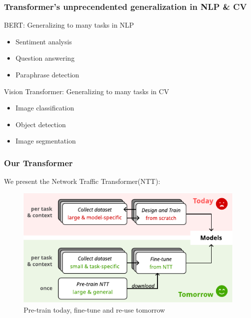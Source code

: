 \documentclass{beamer}
\begin{document}
\begin{frame}
\frametitle{Transformer's unprecendented generalization in NLP \& CV}
\pause

BERT: Generalizing to many tasks in NLP

\begin{itemize}  
    \item<1-> Sentiment analysis
    \item<1-> Question answering
    \item<1-> Paraphrase detection
\end{itemize}
\pause

Vision Transformer: Generalizing to many tasks in CV

\begin{itemize}  
    \item<1-> Image classification
    \item<1-> Object detection
    \item<1-> Image segmentation
\end{itemize}



\end{frame}


\begin{frame}
\frametitle{Our Transformer}

We present the Network Traffic Transformer(NTT):
\pause

\begin{figure}[!hbt]
  \begin{center}
    \includegraphics[scale=1.1]{figures/vision.pdf}
    \caption{Pre-train today, fine-tune and re-use tomorrow}
    \label{fig:vision}
  \end{center}
\end{figure}
    
    
\end{frame}
\end{document}
